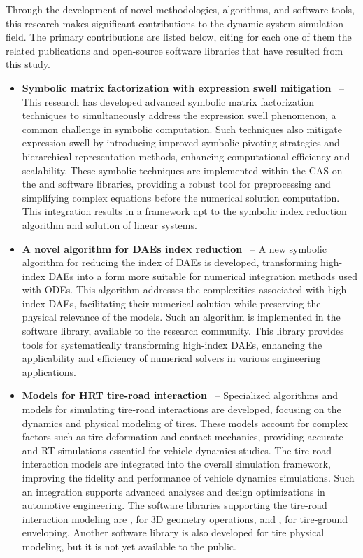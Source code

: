 Through the development of novel methodologies, algorithms, and software tools, this research makes significant contributions to the dynamic system simulation field. The primary contributions are listed below, citing for each one of them the related publications and open-source software libraries that have resulted from this study.
%
\begin{itemize}
  \setlength\itemsep{0.0em}
  \item \textbf{Symbolic matrix factorization with expression swell mitigation}~\cite{lem, last} -- This research has developed advanced symbolic matrix factorization techniques to simultaneously address the expression swell phenomenon, a common challenge in symbolic computation. Such techniques also mitigate expression swell by introducing improved symbolic pivoting strategies and hierarchical representation methods, enhancing computational efficiency and scalability. These symbolic techniques are implemented within the \Maple{} \ac{CAS} on the \LEM{} and \LAST{} software libraries, providing a robust tool for preprocessing and simplifying complex equations before the numerical solution computation. This integration results in a framework apt to the symbolic index reduction algorithm and solution of linear systems.
  \item \textbf{A novel algorithm for \acp{DAE} index reduction}~\cite{indigo, stocco2024symbolic, stocco2024matrix} -- A new symbolic algorithm for reducing the index of \acp{DAE} is developed, transforming high-index \acp{DAE} into a form more suitable for numerical integration methods used with \acp{ODE}. This algorithm addresses the complexities associated with high-index \acp{DAE}, facilitating their numerical solution while preserving the physical relevance of the models. Such an algorithm is implemented in the \Indigo{} software library, available to the research community. This library provides tools for systematically transforming high-index \acp{DAE}, enhancing the applicability and efficiency of numerical solvers in various engineering applications.
  \item \textbf{Models for \ac{HRT} tire-road interaction}~\cite{acme, enve, stocco2021acme, stocco2024novel} -- Specialized algorithms and models for simulating tire-road interactions are developed, focusing on the dynamics and physical modeling of tires. These models account for complex factors such as tire deformation and contact mechanics, providing accurate and \ac{RT} simulations essential for vehicle dynamics studies. The tire-road interaction models are integrated into the overall simulation framework, improving the fidelity and performance of vehicle dynamics simulations. Such an integration supports advanced analyses and design optimizations in automotive engineering. The software libraries supporting the tire-road interaction modeling are \Acme{}, for 3D geometry operations, and \Enve{}, for tire-ground enveloping. Another software library is also developed for tire physical modeling, but it is not yet available to the public.

\end{itemize}
